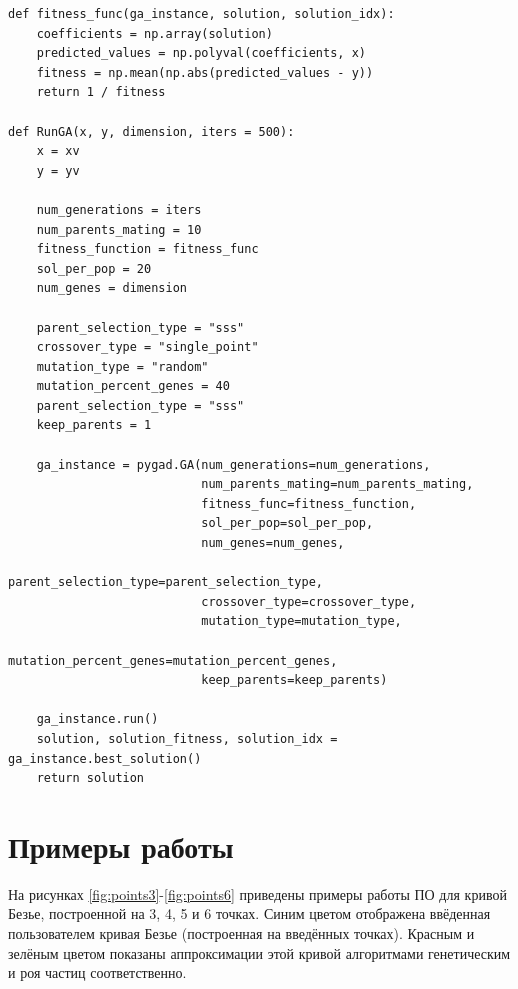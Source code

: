 \documentclass[12pt]{report}
\begin{document}
\begin{lstlisting}[label=lst:gen,caption=Инициализация параметров генетического алгоритма]
def fitness_func(ga_instance, solution, solution_idx):
    coefficients = np.array(solution)
    predicted_values = np.polyval(coefficients, x)
    fitness = np.mean(np.abs(predicted_values - y))
    return 1 / fitness

def RunGA(x, y, dimension, iters = 500):
    x = xv
    y = yv

    num_generations = iters
    num_parents_mating = 10
    fitness_function = fitness_func
    sol_per_pop = 20
    num_genes = dimension

    parent_selection_type = "sss"
    crossover_type = "single_point"
    mutation_type = "random"
    mutation_percent_genes = 40
    parent_selection_type = "sss"
    keep_parents = 1

    ga_instance = pygad.GA(num_generations=num_generations,
                           num_parents_mating=num_parents_mating,
                           fitness_func=fitness_function,
                           sol_per_pop=sol_per_pop,
                           num_genes=num_genes,
                           parent_selection_type=parent_selection_type,
                           crossover_type=crossover_type,
                           mutation_type=mutation_type,
                           mutation_percent_genes=mutation_percent_genes,
                           keep_parents=keep_parents)

    ga_instance.run()
    solution, solution_fitness, solution_idx = ga_instance.best_solution()
    return solution
\end{lstlisting}
\newpage
\section{Примеры работы}
На рисунках \ref{fig:points3}-\ref{fig:points6} приведены примеры работы ПО для кривой Безье, построенной на 3, 4, 5 и 6 точках. Синим цветом отображена ввёденная пользователем кривая Безье (построенная на введённых точках). Красным и зелёным цветом показаны аппроксимации этой кривой алгоритмами генетическим и роя частиц соответственно.
\end{document}
